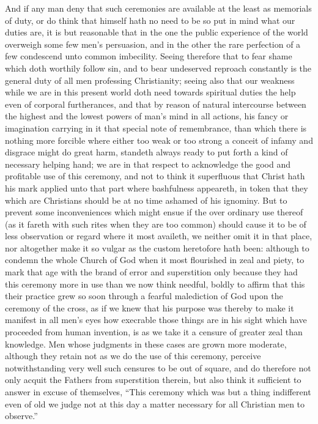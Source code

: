  And if any man deny that such ceremonies are available at the least as memorials of duty, or do think that himself hath no need to be so put in mind what our duties are, it is but reasonable that in the one the public experience of the world overweigh some few men’s persuasion, and in the other the rare perfection of a few condescend unto common imbecility.
Seeing therefore that to fear shame which doth worthily follow sin, and to bear undeserved reproach constantly is the general duty of all men professing Christianity; seeing also that our weakness while we are in this present world doth need towards spiritual duties the help even of corporal furtherances, and that by reason of natural intercourse between the highest and the lowest powers of man’s mind in all actions, his fancy or imagination carrying in it that special note of remembrance, than which there is nothing more forcible where either too weak or too strong a conceit of infamy and disgrace might do great harm, standeth always ready to put forth a kind of necessary helping hand; we are in that respect to acknowledge the good and profitable use of this ceremony, and not to think it superfluous that Christ hath his mark applied unto that part where bashfulness appeareth, in token that they which are Christians should be at no time ashamed of his ignominy.
But to prevent some inconveniences which might ensue if the over ordinary use thereof (as it fareth with such rites when they are too common) should cause it to be of less observation or regard where it most availeth, we neither omit it in that place, nor altogether make it so vulgar as the custom heretofore hath been: although to condemn the whole Church of God when it most flourished in zeal and piety, to mark that age with the brand of error and superstition only because they had this ceremony more in use than we now think needful, boldly to affirm that this their practice grew so soon through a fearful malediction of God upon the ceremony of  the cross,
 as if we knew that his purpose was thereby to make it manifest in all men’s eyes how execrable those things are in his sight which have proceeded from human invention, is as we take it a censure of greater zeal than knowledge. Men whose judgments in these cases are grown more moderate, although they retain not as we do the use of this ceremony, perceive notwithstanding very well such censures to be out of square, and do therefore not only acquit the Fathers from superstition therein, but also think it sufficient to answer in excuse of themselves, “This ceremony which was but a thing indifferent even of old we judge not at this day a matter necessary for all Christian men to observe.”
